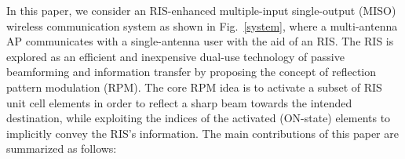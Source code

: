 \documentclass[draftclsnofoot,onecolumn,12pt]{IEEEtran}
\begin{document}
In this paper, we consider an RIS-enhanced multiple-input single-output (MISO) wireless communication system as shown in Fig.~\ref{system}, where a multi-antenna AP communicates with a single-antenna user with the aid of an RIS. 
The RIS is explored as an efficient and inexpensive dual-use technology of passive beamforming and information transfer by proposing the concept of reflection
pattern modulation (RPM). The core RPM idea is to activate a subset of RIS unit cell elements in order 
to reflect a sharp beam towards the intended destination, while exploiting the indices of the activated (ON-state) elements to implicitly convey the RIS's information. 
The main contributions of this paper are summarized as follows:
\end{document}
